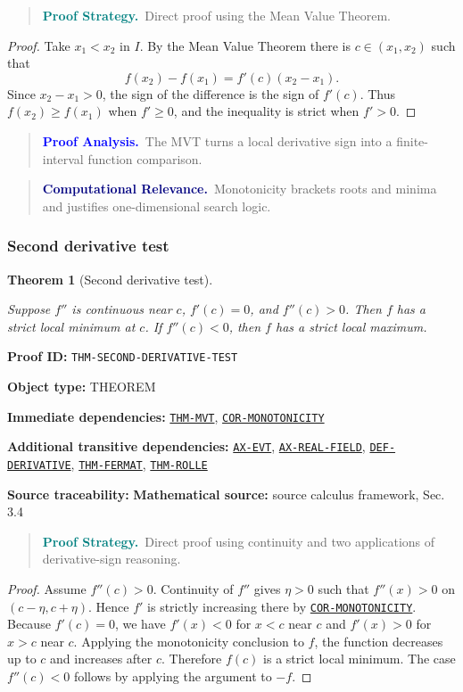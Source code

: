 \documentclass[10pt]{article}
\newcommand{\pidraw}[1]{\begingroup\urlstyle{tt}\nolinkurl{#1}\endgroup}
\newcommand{\pidref}[1]{\hyperref[prf:#1]{\pidraw{#1}}}
\newcommand{\pid}[1]{\pidref{#1}}
\newtheorem{theorem}{Theorem}[section]
\theoremstyle{definition}
\theoremstyle{remark}
\newenvironment{proofstrategy}
{\begin{quote}\small\noindent\textbf{\textcolor{teal}{Proof Strategy.}}\ }
{\end{quote}}
\newenvironment{proofanalysis}
{\begin{quote}\small\noindent\textbf{\textcolor{blue}{Proof Analysis.}}\ }
{\end{quote}}
\newenvironment{computationalrelevance}
{\begin{quote}\small\noindent\textbf{\textcolor{navy}{Computational Relevance.}}\ }
{\end{quote}}
\newcommand{\meta}[2]{\noindent\textbf{#1:} #2\par}
\begin{document}
\begin{proofstrategy}Direct proof using the Mean Value Theorem.\end{proofstrategy}

\begin{proof}

Take $x_1<x_2$ in $I$. By the Mean Value Theorem there is $c\in(x_1,x_2)$ such that
\[
f(x_2)-f(x_1)=f'(c)(x_2-x_1).
\]
Since $x_2-x_1>0$, the sign of the difference is the sign of $f'(c)$.
Thus $f(x_2)\ge f(x_1)$ when $f'\ge0$, and the inequality is strict when
$f'>0$.

\end{proof}

\begin{proofanalysis}The MVT turns a local derivative sign into a finite-interval function comparison.\end{proofanalysis}

\begin{computationalrelevance}Monotonicity brackets roots and minima and justifies one-dimensional search logic.\end{computationalrelevance}

\subsubsection{Second derivative test}

\begin{theorem}[Second derivative test]\label{prf:THM-SECOND-DERIVATIVE-TEST}

Suppose $f''$ is continuous near $c$, $f'(c)=0$, and $f''(c)>0$. Then $f$ has a strict local minimum at $c$. If $f''(c)<0$, then $f$ has a strict local maximum.

\end{theorem}

\meta{Proof ID}{\pidraw{THM-SECOND-DERIVATIVE-TEST}}
\meta{Object type}{THEOREM}
\meta{Immediate dependencies}{\pidref{THM-MVT}, \pidref{COR-MONOTONICITY}}
\meta{Additional transitive dependencies}{\pidref{AX-EVT}, \pidref{AX-REAL-FIELD}, \pidref{DEF-DERIVATIVE}, \pidref{THM-FERMAT}, \pidref{THM-ROLLE}}
\meta{Source traceability}{\textbf{Mathematical source:} source calculus framework, Sec. 3.4}

\begin{proofstrategy}Direct proof using continuity and two applications of derivative-sign reasoning.\end{proofstrategy}

\begin{proof}

Assume $f''(c)>0$. Continuity of $f''$ gives $\eta>0$ such that
$f''(x)>0$ on $(c-\eta,c+\eta)$. Hence $f'$ is strictly increasing there by
\pid{COR-MONOTONICITY}. Because $f'(c)=0$, we have
$f'(x)<0$ for $x<c$ near $c$ and $f'(x)>0$ for $x>c$ near $c$.
Applying the monotonicity conclusion to $f$, the function decreases up to $c$
and increases after $c$. Therefore $f(c)$ is a strict local minimum.
The case $f''(c)<0$ follows by applying the argument to $-f$.

\end{proof}
\end{document}
